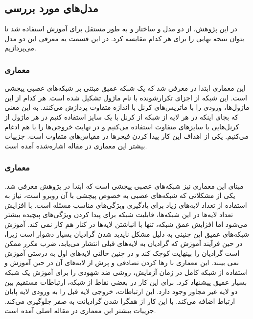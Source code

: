 \subsection{مدل‌های مورد بررسی}\label{subsec:مدل‌های مورد بررسی}
در این پژوهش، از دو مدل و ساختار  و  به طور مستقل برای آموزش استفاده شد تا بتوان نتیجه نهایی را برای هر کدام مقایسه کرد.
در این قسمت یه معرفی این دو مدل می‌پردازیم.

\subsubsection{معماری }
این معماری ابتدا در \cite{szegedy2015going} معرفی شد که یک شبکه عمیق مبتنی بر شبکه‌های عصبی پیچشی است. این شبکه از اجزای تکرارشونده با نام ماژول  تشکیل شده است. هر کدام از این ماژول‌ها، ورودی را با ماتریس‌های کرنل با اندازه متفاوت پردازش می‌کنند. به این معنی که بجای اینکه در هر لایه از شبکه  از کرنل با یک سایز استفاده کنیم در هر ماژول از کرنل‌هایی با سایزهای متفاوت استفاده می‌کنیم و در نهایت خروجی‌ها را با هم ادغام می‌کنیم. یکی از اهداف این کار پیدا کردن فیچرها در مقیاس‌های متفاوت است. جزییات بیشتر این معماری در مقاله اشاره‌شده آمده است.


\subsubsection{معماری }
مبنای این معماری نیز شبکه‌های عصبی پیچشی است که ابتدا در پژوهش \cite{he2016deep} معرفی شد.
یکی از مشکلاتی که شبکه‌های عصبی به خصوص پیچشی با آن روبرو است، نیاز به استفاده از تعداد لایه‌های زیاد برای یادگیری ویژگی‌های مناسب مسئله است.
با افزایش تعداد لایه‌ها در این شبکه‌ها، قابلیت شبکه برای پیدا کردن ویژگی‌های پیچیده بیشتر می‌شود اما افزایش عمق شبکه، تنها با انباشتن لایه‌ها در کنار هم کار نمی کند.
آموزش شبکه‌های عمیق این چنینی به دلیل مشکل ناپدید شدن گرادیان بسیار دشوار است زیرا، در حین فرآیند آموزش که گرادیان به لایه‌های قبلی انتشار می‌یابد، ضرب مکرر ممکن است گرادیان را بینهایت کوچک کند و در چنین حالتی لایه‌های اول به درستی آموزش نمی بینند.
این معماری با رها کردن تصادفی و پرش از لایه‌های آن در حین آموزش و استفاده از شبکه کامل در زمان آزمایش، روشی ضد شهودی را برای آموزش یک شبکه بسیار عمیق پیشنهاد کرد. برای این کار در بعضی نقاط از شبکه، ارتباطات مستقیم بین دو لایه غیر مجاور وجود دارد. این ارتباطات، خروجی لایه قبل را به ورودی لایه پایان ارتباط اضافه می‌کند. با این کار از همگرا شدن گرادیانت به صفر جلوگیری می‌کند. جزییات بیشتر این معماری در مقاله اصلی آمده است.